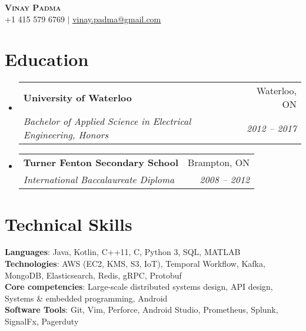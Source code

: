 \documentclass[letterpaper,11pt]{article}
\makeatletter
\newcommand{\educationSubheading}[4]{
  \vspace{-2pt}\item
    \begin{tabular*}{0.97\textwidth}[t]{l@{\extracolsep{\fill}}r}
      \textbf{\large#1} & #2 \\
      \textit{\small#3} & \textit{\small #4} \\
    \end{tabular*}\vspace{-7pt}
}
\newcommand{\resumeSubHeadingListStart}{\begin{itemize}[leftmargin=0.15in, label={}]}
\newcommand{\resumeSubHeadingListEnd}{\end{itemize}}
\makeatother
\begin{document}
\begin{center}
    \textbf{\Huge \scshape Vinay Padma} \\ \vspace{1pt}
    \small +1 415 579 6769 $|$ \href{mailto:vinay.padma@gmail.com}{\underline{vinay.padma@gmail.com}}
\end{center}

\section{Education}
  \resumeSubHeadingListStart
    \educationSubheading
      {University of Waterloo}{Waterloo, ON}
      {Bachelor of Applied Science in Electrical Engineering, Honors}{2012 -- 2017}
    \educationSubheading
      {Turner Fenton Secondary School}{Brampton, ON}
      {International Baccalaureate Diploma}{2008 -- 2012}
  \resumeSubHeadingListEnd

\section{Technical Skills}
 \begin{itemize}[leftmargin=0.15in, label={}]
    \small{\item{
     \textbf{Languages}{: Java, Kotlin, C++11, C, Python 3, SQL, MATLAB} \\
     \textbf{Technologies}{: AWS (EC2, KMS, S3, IoT), Temporal Workflow, Kafka, MongoDB, Elasticsearch, Redis, gRPC, Protobuf} \\
     \textbf{Core competencies}{: Large-scale distributed systems design, API design, Systems \& embedded programming, Android} \\
     \textbf{Software Tools}{: Git, Vim, Perforce, Android Studio, Prometheus, Splunk, SignalFx, Pagerduty}
    }}
 \end{itemize}

\end{document}
